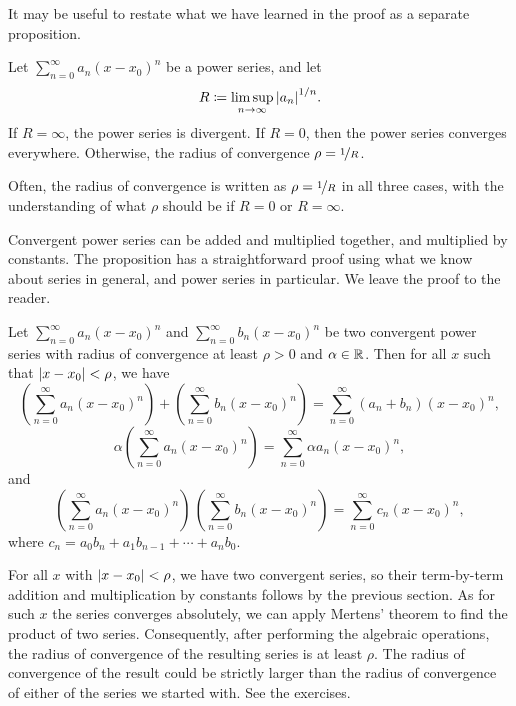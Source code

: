 It may be useful to restate what we have learned in the proof
as a separate proposition.

\begin{prop}
Let $\sum_{n=0}^\infty a_n {(x-x_0)}^n$ be a power series, and let
\begin{equation*}
R \coloneqq \limsup_{n\to\infty} {\lvert {a_n} \rvert}^{1/n} .
\end{equation*}
If $R = \infty$, the power series is divergent.  If
$R=0$, then the power series converges everywhere.   Otherwise,
the radius of convergence $\rho = \nicefrac{1}{R}$.
\end{prop}

Often, the radius of convergence is written as $\rho = \nicefrac{1}{R}$ in all
three cases, with
the understanding of what $\rho$ should be if $R = 0$ or $R =
\infty$.

\pagebreak[2]
Convergent power series can be added and multiplied together, and multiplied
by constants.
The proposition has a straightforward proof using what we know about series
in general, and power series in particular.  We leave the proof to the reader.

\begin{prop}
Let $\sum_{n=0}^\infty a_n {(x-x_0)}^n$ and
$\sum_{n=0}^\infty b_n {(x-x_0)}^n$ be two convergent power series
with radius of convergence at least $\rho > 0$ and $\alpha \in {\mathbb{R}}$.  Then
for all $x$ such that $\lvert {x-x_0} \rvert < \rho$, we have 
\begin{equation*}
\left(\sum_{n=0}^\infty a_n {(x-x_0)}^n\right)
+
\left(\sum_{n=0}^\infty b_n {(x-x_0)}^n\right)
=
\sum_{n=0}^\infty (a_n+b_n) {(x-x_0)}^n ,
\end{equation*}
\begin{equation*}
\alpha
\left(\sum_{n=0}^\infty a_n {(x-x_0)}^n\right)
=
\sum_{n=0}^\infty \alpha a_n {(x-x_0)}^n ,
\end{equation*}
and
\begin{equation*}
\left(\sum_{n=0}^\infty a_n {(x-x_0)}^n\right)
\,
\left(\sum_{n=0}^\infty b_n {(x-x_0)}^n\right)
=
\sum_{n=0}^\infty c_n {(x-x_0)}^n ,
\end{equation*}
where
$c_n = a_0b_n + a_1 b_{n-1} + \cdots + a_n b_0$.
\end{prop}

For all $x$ with $\lvert {x-x_0} \rvert < \rho$, we have two convergent series, so
their term-by-term addition and multiplication by constants
follows by the previous section.
As for such $x$ the series converges absolutely,
we can apply Mertens' theorem to find the product of two series.
Consequently, after performing the algebraic operations, the
radius of convergence of the resulting series is at least $\rho$.
The radius of convergence of the result could be strictly larger than
the radius of convergence of either of the series we started with.
See the exercises.

